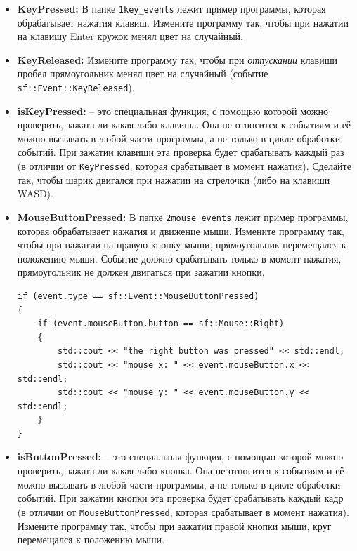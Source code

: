 \documentclass{article}
\begin{document}
\begin{itemize}
\item \textbf{KeyPressed:} В папке \texttt{1key\_events} лежит пример программы, которая обрабатывает нажатия клавиш. Измените программу так, чтобы при нажатии на клавишу Enter кружок менял цвет на случайный.

\item \textbf{KeyReleased:} Измените программу так, чтобы при \textit{отпускании} клавиши пробел прямоугольник менял цвет на случайный (событие \texttt{sf::Event::KeyReleased}).

\item \textbf{isKeyPressed:} -- это специальная функция, с помощью которой можно проверить, зажата ли какая-либо клавиша. Она не относится к событиям и её можно вызывать в любой части программы, а не только в цикле обработки событий. При зажатии клавиши эта проверка будет срабатывать каждый раз (в отличии от \texttt{KeyPressed}, которая срабатывает в момент нажатия). Сделайте так, чтобы шарик двигался при нажатии на стрелочки (либо на клавиши WASD).

\item \textbf{MouseButtonPressed:} В папке \texttt{2mouse\_events} лежит пример программы, которая обрабатывает нажатия и движение мыши. Измените программу так, чтобы при нажатии на правую кнопку мыши, прямоугольник перемещался к положению мыши. Событие должно срабатывать только в момент нажатия, прямоугольник не должен двигаться при зажатии кнопки.
\begin{lstlisting}
if (event.type == sf::Event::MouseButtonPressed)
{
    if (event.mouseButton.button == sf::Mouse::Right)
    {
        std::cout << "the right button was pressed" << std::endl;
        std::cout << "mouse x: " << event.mouseButton.x << std::endl;
        std::cout << "mouse y: " << event.mouseButton.y << std::endl;
    }
}
\end{lstlisting}

\item \textbf{isButtonPressed:} -- это специальная функция, с помощью которой можно проверить, зажата ли какая-либо кнопка. Она не относится к событиям и её можно вызывать в любой части программы, а не только в цикле обработки событий. При зажатии кнопки эта проверка будет срабатывать каждый кадр (в отличии от \texttt{MouseButtonPressed}, которая срабатывает в момент нажатия). Измените программу так, чтобы при зажатии правой кнопки мыши, круг перемещался к положению мыши.



\end{itemize}
\end{document}
